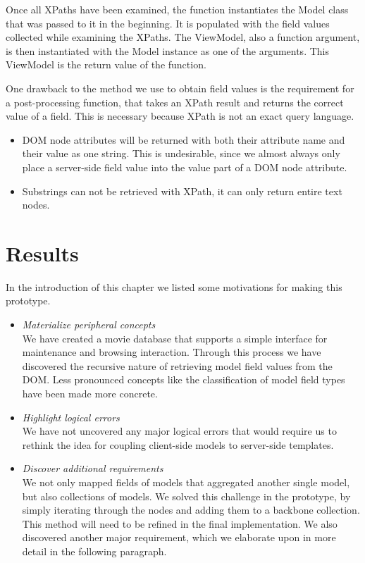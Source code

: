 \documentclass[thesis.tex]{subfiles}
\begin{document}
Once all XPaths have been examined, the function instantiates the Model class
that was passed to it in the beginning. It is populated with the field values
collected while examining the XPaths.
The ViewModel, also a function argument, is then instantiated with
the Model instance as one of the arguments.
This ViewModel is the return value of the function.

One drawback to the method we use to obtain field values is the requirement
for a post-processing function, that takes an XPath result and
returns the correct value of a field.
This is necessary because XPath is not an exact query language.
\begin{itemize}
	\item DOM node attributes will be returned with both their attribute name and
	their value as one string. This is undesirable, since we almost always only
	place a server-side field value into the value part of a DOM node attribute.
	\item Substrings can not be retrieved with XPath, it can only return entire
	text nodes.
\end{itemize}

\section{Results}
\label{sec:first-results}
In the introduction of this chapter we listed some motivations for making
this prototype.

\begin{itemize}
	\item \emph{Materialize peripheral concepts}\\
	We have created a movie database that supports a simple interface
	for maintenance and browsing interaction.
	Through this process we have discovered the recursive nature of retrieving
	model field values from the DOM.
	Less pronounced concepts like the classification of model field types have 
	been made more concrete.
	\item \emph{Highlight logical errors}\\
	We have not uncovered any major logical errors that would require us to
	rethink the idea for coupling client-side models to server-side templates.
	\item \emph{Discover additional requirements}\\
	We not only mapped fields of models that aggregated another single model,
	but also collections of models. We solved this challenge in the prototype,
	by simply iterating through the nodes and adding them to
	a backbone collection. This method will need to be refined in the final
	implementation.
	We also discovered another major requirement, which we elaborate upon in more
	detail in the following paragraph.
\end{itemize}
\end{document}
